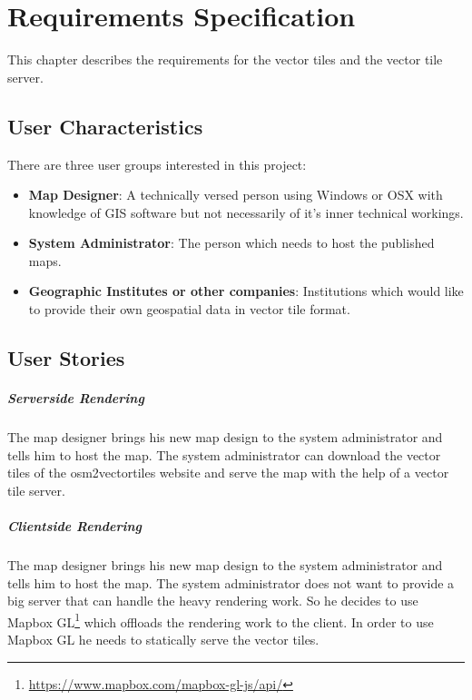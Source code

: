 \chapter{Requirements Specification}\label{requirements_specification}

This chapter describes the requirements for the vector tiles and the vector tile server.

\section{User Characteristics}\label{user_characteristics}

There are three user groups interested in this project:

\begin{itemize}
\item
  \textbf{Map Designer}: A technically versed person using Windows or
  OSX with knowledge of GIS software but not necessarily of it's
  inner technical workings.
\item
  \textbf{System Administrator}: The person which needs to host the
  published maps.
\item
  \textbf{Geographic Institutes or other companies}: Institutions which would like to provide their own geospatial data in vector tile format. 
\end{itemize}

\section{User Stories}\label{user_stories}
\paragraph{Serverside Rendering}
The map designer brings his new map design to the system administrator and tells him to host the map. The system administrator can download the vector tiles of the osm2vectortiles website and serve the map with the help of a vector tile server.

\paragraph{Clientside Rendering}
The map designer brings his new map design to the system administrator and tells him to host the map. The system administrator does not want to provide a big server that can handle the heavy rendering work. So he decides to use Mapbox GL\footnote{\url{https://www.mapbox.com/mapbox-gl-js/api/}} which offloads the rendering work to the client. In order to use Mapbox GL he needs to statically serve the vector tiles. 

